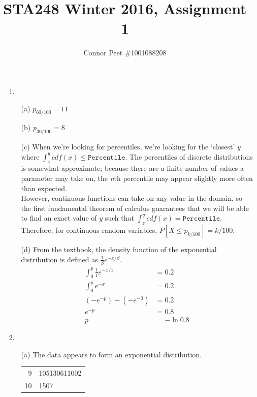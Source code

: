 \documentclass{article}
\title{STA248 Winter 2016, Assignment 1}
\author{Connor Peet \#1001088208}
\begin{document}
\maketitle

\lstset{
    numbers=left
}

\begin{enumerate}
\item [1.]
    \begin{enumerate}
    \item [(a)] $p_{60/100} = 11$
    \item [(b)] $p_{30/100} = 8$
    \item [(c)] When we're looking for percentiles, we're looking for the `closest' $y$ where $\int^y_z cdf(x) \leq \texttt{Percentile}$. The percentiles of discrete distributions is somewhat approximate; because there are a finite number of values a parameter may take on, the \textit{n}th percentile may appear slightly more often than expected. \\
    However, continuous functions can take on any value in the domain, so the first fundamental theorem of calculus guarantees that we will be able to find an exact value of $y$ such that $\int^y_z cdf(x) = \texttt{Percentile}$. Therefore, for continuous random variables, $P[X \leq p_{k / 100}] = k / 100$.
    \item [(d)] From the textbook, the density function of the exponential distribution is defined as $\frac{1}{\beta} e^{-x / \beta}$.
        \begin{equation*}
        \begin{aligned}
        \int_0^p \frac{1}{1} e^{-x / 1} &= 0.2 \\
        \int_0^p e^{-x} &= 0.2 \\
        (-e^{-p}) - (-e^{-0}) &= 0.2 \\
        e^{-p} &= 0.8 \\
        p &= - \ln 0.8
        \end{aligned}
        \end{equation*}
    \end{enumerate}
\item [2.]
    \begin{enumerate}
    \item [(a)] The data appears to form an exponential distribution.
        \begin{center}
        \begin{tabular}{ r | l }
            9  & 105130611002 \\
            10 & 1507 \\

\end{tabular}
\end{center}
\end{enumerate}
\end{enumerate}
\end{document}
